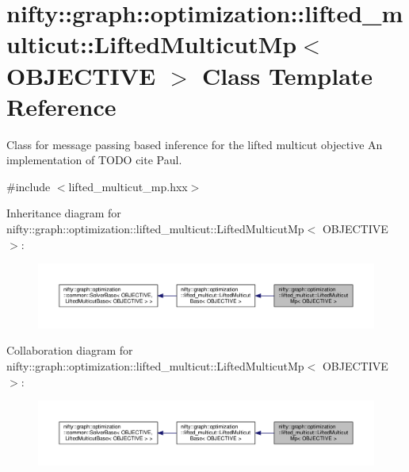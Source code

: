 \hypertarget{classnifty_1_1graph_1_1optimization_1_1lifted__multicut_1_1LiftedMulticutMp}{}\section{nifty\+:\+:graph\+:\+:optimization\+:\+:lifted\+\_\+multicut\+:\+:Lifted\+Multicut\+Mp$<$ O\+B\+J\+E\+C\+T\+I\+V\+E $>$ Class Template Reference}
\label{classnifty_1_1graph_1_1optimization_1_1lifted__multicut_1_1LiftedMulticutMp}


Class for message passing based inference for the lifted multicut objective An implementation of T\+O\+D\+O cite Paul.  




{\ttfamily \#include $<$lifted\+\_\+multicut\+\_\+mp.\+hxx$>$}



Inheritance diagram for nifty\+:\+:graph\+:\+:optimization\+:\+:lifted\+\_\+multicut\+:\+:Lifted\+Multicut\+Mp$<$ O\+B\+J\+E\+C\+T\+I\+V\+E $>$\+:\nopagebreak
\begin{figure}[H]
\begin{center}
\leavevmode
\includegraphics[width=350pt]{classnifty_1_1graph_1_1optimization_1_1lifted__multicut_1_1LiftedMulticutMp__inherit__graph}
\end{center}
\end{figure}


Collaboration diagram for nifty\+:\+:graph\+:\+:optimization\+:\+:lifted\+\_\+multicut\+:\+:Lifted\+Multicut\+Mp$<$ O\+B\+J\+E\+C\+T\+I\+V\+E $>$\+:\nopagebreak
\begin{figure}[H]
\begin{center}
\leavevmode
\includegraphics[width=350pt]{classnifty_1_1graph_1_1optimization_1_1lifted__multicut_1_1LiftedMulticutMp__coll__graph}
\end{center}
\end{figure}
